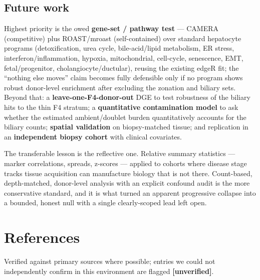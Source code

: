 \documentclass[11pt,a4paper]{article}
\begin{document}
\subsection{Future work}

Highest priority is the owed \textbf{gene-set / pathway test} --- CAMERA (competitive) plus ROAST/mroast (self-contained) over standard hepatocyte programs (detoxification, urea cycle, bile-acid/lipid metabolism, ER stress, interferon/inflammation, hypoxia, mitochondrial, cell-cycle, senescence, EMT, fetal/progenitor, cholangiocyte/ductular), reusing the existing edgeR fit; the ``nothing else moves'' claim becomes fully defensible only if no program shows robust donor-level enrichment after excluding the zonation and biliary sets. Beyond that: a \textbf{leave-one-F4-donor-out} DGE to test robustness of the biliary hits to the thin F4 stratum; a \textbf{quantitative contamination model} to ask whether the estimated ambient/doublet burden quantitatively accounts for the biliary counts; \textbf{spatial validation} on biopsy-matched tissue; and replication in an \textbf{independent biopsy cohort} with clinical covariates.

The transferable lesson is the reflective one. Relative summary statistics --- marker correlations, spreads, z-scores --- applied to cohorts where disease stage tracks tissue acquisition can manufacture biology that is not there. Count-based, depth-matched, donor-level analysis with an explicit confound audit is the more conservative standard, and it is what turned an apparent progressive collapse into a bounded, honest null with a single clearly-scoped lead left open.

\FloatBarrier
\section{References}

Verified against primary sources where possible; entries we could not independently confirm in this environment are flagged \textbf{[unverified]}.
\end{document}

